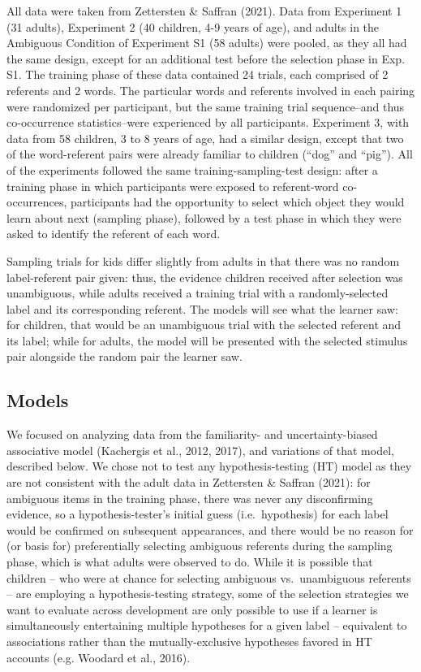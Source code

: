 \documentclass[10pt, letterpaper]{article}
\begin{document}
All data were taken from Zettersten \& Saffran (2021). Data from
Experiment 1 (31 adults), Experiment 2 (40 children, 4-9 years of age),
and adults in the Ambiguous Condition of Experiment S1 (58 adults) were
pooled, as they all had the same design, except for an additional test
before the selection phase in Exp. S1. The training phase of these data
contained 24 trials, each comprised of 2 referents and 2 words. The
particular words and referents involved in each pairing were randomized
per participant, but the same training trial sequence--and thus
co-occurrence statistics--were experienced by all participants.
Experiment 3, with data from 58 children, 3 to 8 years of age, had a
similar design, except that two of the word-referent pairs were already
familiar to children (``dog'' and ``pig''). All of the experiments
followed the same training-sampling-test design: after a training phase
in which participants were exposed to referent-word co-occurrences,
participants had the opportunity to select which object they would learn
about next (sampling phase), followed by a test phase in which they were
asked to identify the referent of each word.

Sampling trials for kids differ slightly from adults in that there was
no random label-referent pair given: thus, the evidence children
received after selection was unambiguous, while adults received a
training trial with a randomly-selected label and its corresponding
referent. The models will see what the learner saw: for children, that
would be an unambiguous trial with the selected referent and its label;
while for adults, the model will be presented with the selected stimulus
pair alongside the random pair the learner saw.

\subsection{Models}\label{models}

We focused on analyzing data from the familiarity- and
uncertainty-biased associative model (Kachergis et al., 2012, 2017), and
variations of that model, described below. We chose not to test any
hypothesis-testing (HT) model as they are not consistent with the adult
data in Zettersten \& Saffran (2021): for ambiguous items in the
training phase, there was never any disconfirming evidence, so a
hypothesis-tester's initial guess (i.e.~hypothesis) for each label would
be confirmed on subsequent appearances, and there would be no reason for
(or basis for) preferentially selecting ambiguous referents during the
sampling phase, which is what adults were observed to do. While it is
possible that children -- who were at chance for selecting ambiguous
vs.~unambiguous referents -- are employing a hypothesis-testing
strategy, some of the selection strategies we want to evaluate across
development are only possible to use if a learner is simultaneously
entertaining multiple hypotheses for a given label -- equivalent to
associations rather than the mutually-exclusive hypotheses favored in HT
accounts (e.g. Woodard et al., 2016).
\end{document}
